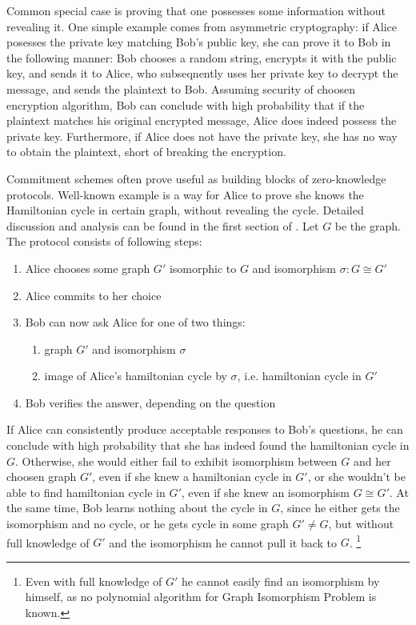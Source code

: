 \documentclass[10pt]{article}
\begin{document}
Common special case is proving that one possesses some information without revealing it.
One simple example comes from asymmetric cryptography: if Alice posesses the private key matching Bob's
public key, she can prove it to Bob in the following manner: Bob chooses a random string, encrypts it
with the public key, and sends it to Alice, who subseqnently uses her private key to decrypt the message,
and sends the plaintext to Bob. Assuming security of choosen encryption algorithm, Bob can conclude 
with high probability that if the plaintext matches his original encrypted message, Alice does indeed
possess the private key. Furthermore, if Alice does not have the private key, she has no way to obtain
the plaintext, short of breaking the encryption.

Commitment schemes often prove useful as building blocks of zero-knowledge protocols. Well-known example
is a way for Alice to prove she knows the Hamiltonian cycle in certain graph, without revealing the
cycle. Detailed discussion and analysis can be found in the first section of \cite{CM:CryptoNotes}. 
Let \(G\) be the graph. The protocol consists of following steps:

\begin{enumerate}
  \item Alice chooses some graph \(G'\) isomorphic to \(G\) and isomorphism \(\sigma\colon G\cong G'\)
  \item Alice commits to her choice
  \item Bob can now ask Alice for one of two things:
    \begin{enumerate}
      \item graph \(G'\) and isomorphism \(\sigma\)
      \item image of Alice's hamiltonian cycle by \(\sigma\), i.e. hamiltonian cycle in \(G'\)
    \end{enumerate}
  \item Bob verifies the answer, depending on the question
\end{enumerate}

If Alice can consistently produce acceptable responses to Bob's questions, he can conclude with high
probability that she has indeed found the hamiltonian cycle in \(G\). Otherwise, she would either fail
to exhibit isomorphism between \(G\) and her choosen graph \(G'\), even if she knew a hamiltonian
cycle in \(G'\), or she wouldn't be able to find hamiltonian cycle in \(G'\), even if she knew an
isomorphism \(G\cong G'\). At the same time, Bob learns nothing about the cycle in \(G\), since he
either gets the isomorphism and no cycle, or he gets cycle in some graph \(G'\neq G\), but without
full knowledge of \(G'\) and the isomorphism he cannot pull it back to \(G\).
\footnote{Even with full knowledge of \(G'\) he cannot easily find an isomorphism by himself, as no
polynomial algorithm for Graph Isomorphism Problem is known.}
\end{document}
